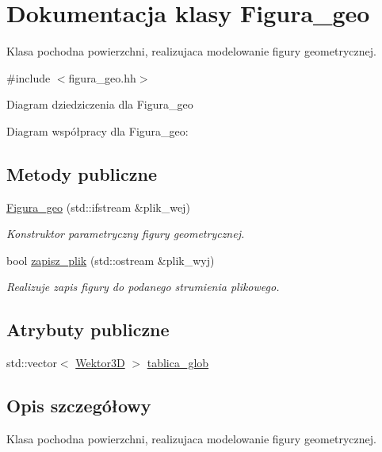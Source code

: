 \hypertarget{class_figura__geo}{}\section{Dokumentacja klasy Figura\+\_\+geo}
\label{class_figura__geo}


Klasa pochodna powierzchni, realizujaca modelowanie figury geometrycznej.  




{\ttfamily \#include $<$figura\+\_\+geo.\+hh$>$}



Diagram dziedziczenia dla Figura\+\_\+geo


Diagram współpracy dla Figura\+\_\+geo\+:
\subsection*{Metody publiczne}
\begin{DoxyCompactItemize}
\item 
\hyperlink{class_figura__geo_ab50d6546e1c8307aa8a0140da3c99c46}{Figura\+\_\+geo} (std\+::ifstream \&plik\+\_\+wej)
\begin{DoxyCompactList}\small\item\em Konstruktor parametryczny figury geometrycznej. \end{DoxyCompactList}\item 
bool \hyperlink{class_figura__geo_a483685b8109e5413d4f67eda90990e09}{zapisz\+\_\+plik} (std\+::ostream \&plik\+\_\+wyj)
\begin{DoxyCompactList}\small\item\em Realizuje zapis figury do podanego strumienia plikowego. \end{DoxyCompactList}\end{DoxyCompactItemize}
\subsection*{Atrybuty publiczne}
\begin{DoxyCompactItemize}
\item 
std\+::vector$<$ \hyperlink{class_wektor3_d}{Wektor3D} $>$ \hyperlink{class_figura__geo_a713a4371474b4f5b4d37be1f246da7fc}{tablica\+\_\+glob}
\end{DoxyCompactItemize}


\subsection{Opis szczegółowy}
Klasa pochodna powierzchni, realizujaca modelowanie figury geometrycznej. 


